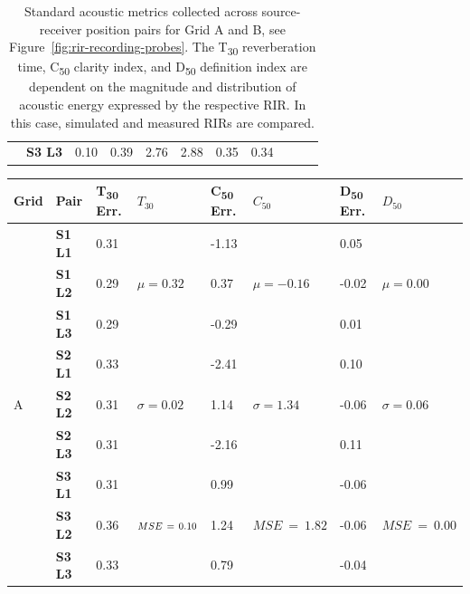 \begin{table}[]
\begin{tabular}{@{}lllllllllll@{}}
                        & \textbf{S3 L3} & 0.10 & 0.39 & 2.76 & 2.88 & 0.35 & 0.34 \\ \cmidrule(l){1-8} 
\end{tabular}
\caption{Standard acoustic metrics collected across source-receiver position pairs for Grid A and B, see Figure~\ref{fig:rir-recording-probes}. The T\textsubscript{30} reverberation time, C\textsubscript{50} clarity index, and D\textsubscript{50} definition index are dependent on the magnitude and distribution of acoustic energy expressed by the respective RIR. In this case, simulated and measured RIRs are compared.}
\label{tab:rt-metrics}
\end{table}

\begin{table}[]
\begin{tabular}{@{}llllllll@{}}
\toprule
Grid & Pair & T\textsubscript{30} Err. & $T_{30}$ & C\textsubscript{50} Err. & $C_{50}$ & D\textsubscript{50} Err. &  $D_{50}$ \\ \midrule
    \multirow{9}{*}{A}  & \textbf{S1 L1} & 0.31  & \multirow{3}{*}{$\mu = 0.32$} & -1.13 & \multirow{3}{*}{$\mu = -0.16$} & 0.05  & \multirow{3}{*}{$\mu = 0.00$} \\
       & \textbf{S1 L2} & 0.29 &                       & 0.37  &                        & -0.02 &                       \\
       & \textbf{S1 L3} & 0.29 &                       & -0.29 &                        & 0.01  &                       \\
       & \textbf{S2 L1} & 0.33 & \multirow{3}{*}{$\sigma = 0.02$} & -2.41 & \multirow{3}{*}{$\sigma = 1.34$}  & 0.10  & \multirow{3}{*}{$\sigma = 0.06$} \\
       & \textbf{S2 L2} & 0.31 &                       & 1.14  &                        & -0.06 &                       \\
       & \textbf{S2 L3} & 0.31 &                       & -2.16 &                        & 0.11  &                       \\
       & \textbf{S3 L1} & 0.31 & \multirow{3}{*}{$\scriptstyle{MSE}~=~\normalsize{0.10}$} & 0.99  & \multirow{3}{*}{$\scriptstyle{MSE}~=~1.82$}  & -0.06 & \multirow{3}{*}{$\scriptstyle{MSE}~=~0.00$} \\
       & \textbf{S3 L2} & 0.36 &                       & 1.24  &                        & -0.06 &                       \\
       & \textbf{S3 L3} & 0.33 &                       & 0.79  &                        & -0.04 &                       \\ \cmidrule(l){1-8}

\end{tabular}
\end{table}
